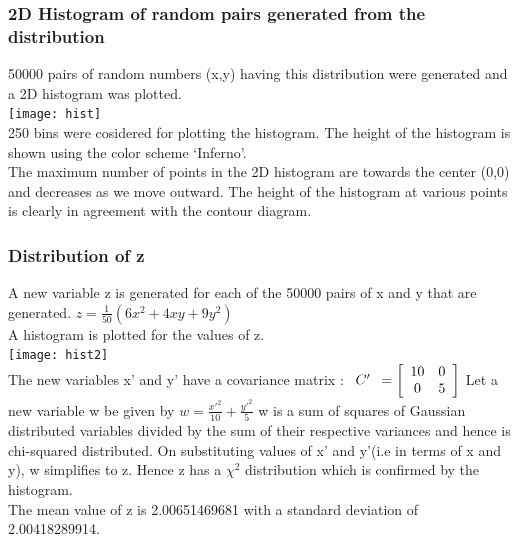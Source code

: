 \documentclass{extarticle}
\begin{document}
		\subsubsection{\color{RoyalBlue} 2D Histogram of random pairs generated from the distribution}
			50000 pairs of random numbers (x,y) having this distribution were generated and a 2D histogram was plotted. \\
			\texttt{[image: hist]} \\
			250 bins were cosidered for plotting the histogram. The height of the histogram is shown using the color scheme 			`Inferno'. \\
			The maximum number of points in the 2D histogram are towards the center (0,0) and decreases as we move outward.
			The height of the histogram at various points is clearly in agreement with the contour diagram.

		\subsubsection{\color{RoyalBlue} Distribution of z}
			A new variable z is generated for each of the 50000 pairs of x and y that are generated.
			$ z = \frac{1}{50} (6x^2 + 4xy + 9y^2) $ \\
			A histogram is plotted for the values of z. \\
			\texttt{[image: hist2]} \\
			The new variables x' and y' have a covariance matrix :
			$ \begin{array}{c} C' \end{array} = \left [\begin{array}{c c} 10 & 0 \\0 & 5\end{array} \right ] $
			Let a new variable w be given by
			$ w = \frac{{x'}^2}{10} + \frac{{y'}^2}{5} $
			w is a sum of squares of Gaussian distributed variables divided by the sum of their respective variances and hence 				is chi-squared distributed. On substituting values of x' and y'(i.e in terms of x and y), w simplifies to z.
			Hence z has a $ \chi^2 $ distribution which is confirmed by the histogram. \\
			The mean value of z is 2.00651469681 with a standard deviation of 2.00418289914.


		\newpage
\end{document}
